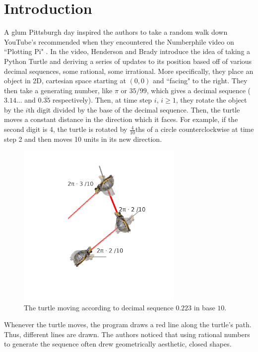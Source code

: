 \documentclass[11pt,titlepage]{article}
\begin{document}
\section{Introduction}
A glum Pittsburgh day inspired the authors to take a random walk down YouTube's recommended
when they encountered the Numberphile video on ``Plotting Pi" \cite{NumberphileVid}.
In the video, Henderson and Brady introduce the idea of taking a Python Turtle and
deriving a series of updates to its position based off of various decimal sequences, 
some rational, some irrational. More specifically, they place an object in 2D, cartesian
space starting at $(0, 0)$ and ``facing" to the right. They then take a generating number, like $\pi$ or $35/99$, 
which gives a decimal sequence ($3.14...$ and $0.\bar{35}$ respectively). 
Then, at time step $i$, $i \geq 1$, they rotate the object by the $i$th digit divided by the base of
the decimal sequence. Then, the turtle moves a constant distance in the direction which it faces.
For example, if the second digit is 4, the turtle is rotated by $\frac{4}{10}$ths of a circle
counterclockwise at time step 2 and then moves 10 units in its new direction.
\begin{figure}[h]
  \centering
  \includegraphics[width=8cm]{fig/turtle2dtimestep.png}
  \caption{The turtle moving according to decimal sequence $0.223$ in base $10$.}
\end{figure}

Whenever the turtle moves, the program draws a red line along the turtle's path. Thus,
different lines are drawn.
The authors noticed that using rational numbers to generate the sequence often drew geometrically
aesthetic, closed shapes.
\end{document}
